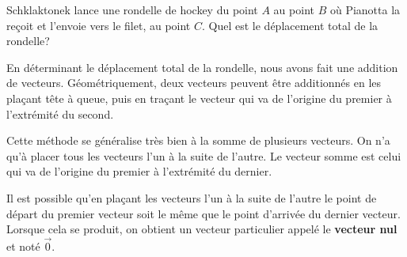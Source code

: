 Schklaktonek lance une rondelle de hockey du point $A$ au point $B$ où Pianotta
la reçoit et l'envoie vers le filet, au point $C$.  Quel est le déplacement
total de la rondelle?

\begin{marginfigure}
\end{marginfigure}

En déterminant le déplacement total de la rondelle, nous avons fait une
addition de vecteurs.  Géométriquement, deux vecteurs peuvent être additionnés
en les plaçant tête à queue, puis en traçant le vecteur qui va de l'origine du
premier à l'extrémité du second.

Cette méthode se généralise très bien à la somme de plusieurs vecteurs.  On n'a
qu'à placer tous les vecteurs l'un à la suite de l'autre.  Le vecteur somme est
celui qui va de l'origine du premier à l'extrémité du dernier.

\begin{marginfigure}
\end{marginfigure}

Il est possible qu'en plaçant les vecteurs l'un à la suite de l'autre le point
de départ du premier vecteur soit le même que le point d'arrivée du dernier
vecteur.  Lorsque cela se produit, on obtient un vecteur particulier appelé le
\textbf{vecteur nul} et noté $\vec{0}$.

